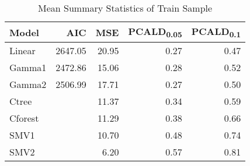 \begin{table}[h]
\centering
{\small
\begin{tabular}{lrrrr}
  \toprule
Model & AIC & MSE & PCALD\textsubscript{0.05} & PCALD\textsubscript{0.1} \\ 
  \midrule
Linear & 2647.05 & 20.95 & 0.27 & 0.47 \\ 
  Gamma1 & 2472.86 & 15.06 & 0.28 & 0.52 \\ 
  Gamma2 & 2506.99 & 17.71 & 0.27 & 0.50 \\ 
  Ctree &  & 11.37 & 0.34 & 0.59 \\ 
  Cforest &  & 11.29 & 0.38 & 0.66 \\ 
  SMV1 &  & 10.70 & 0.48 & 0.74 \\ 
  SMV2 &  & 6.20 & 0.57 & 0.81 \\ 
   \bottomrule
\end{tabular}
}
\caption{Mean Summary Statistics of Train Sample} 
\label{ta:sumTrain}
\end{table}
